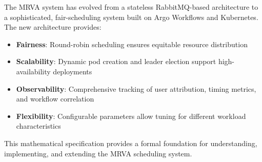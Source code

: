 \documentclass[11pt]{article}
\begin{document}
The MRVA system has evolved from a stateless RabbitMQ-based architecture to a sophisticated, fair-scheduling system built on Argo Workflows and Kubernetes. The new architecture provides:

\begin{itemize}
\item \textbf{Fairness}: Round-robin scheduling ensures equitable resource distribution
\item \textbf{Scalability}: Dynamic pod creation and leader election support high-availability deployments
\item \textbf{Observability}: Comprehensive tracking of user attribution, timing metrics, and workflow correlation
\item \textbf{Flexibility}: Configurable parameters allow tuning for different workload characteristics
\end{itemize}

This mathematical specification provides a formal foundation for understanding, implementing, and extending the MRVA scheduling system.
\end{document}
